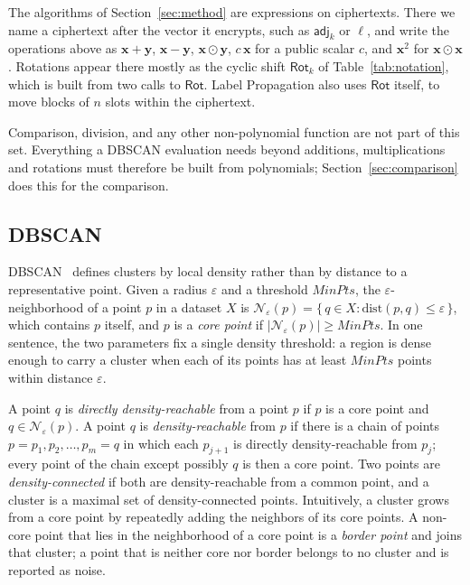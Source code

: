The algorithms of Section~\ref{sec:method} are expressions on
ciphertexts. There we name a ciphertext after the vector it encrypts,
such as $\mathsf{adj}_k$ or $\boldsymbol{\ell}$, and write the
operations above as $\mathbf{x} + \mathbf{y}$, $\mathbf{x} - \mathbf{y}$,
$\mathbf{x} \odot \mathbf{y}$, $c\,\mathbf{x}$ for a public scalar $c$,
and $\mathbf{x}^{2}$ for $\mathbf{x} \odot \mathbf{x}$. Rotations appear
there mostly as the cyclic shift $\mathsf{Rot}_k$ of
Table~\ref{tab:notation}, which is built from two calls to
$\mathsf{Rot}$. Label Propagation also uses $\mathsf{Rot}$ itself, to
move blocks of $n$ slots within the ciphertext.

Comparison, division, and any other non-polynomial function are not part
of this set. Everything a DBSCAN evaluation needs beyond additions,
multiplications and rotations must therefore be built from polynomials;
Section~\ref{sec:comparison} does this for the comparison.

\subsection{DBSCAN}
\label{sec:dbscan}

DBSCAN~\cite{ester1996density} defines clusters by local density rather
than by distance to a representative point. Given a radius $\varepsilon$
and a threshold $\mathit{MinPts}$, the $\varepsilon$-neighborhood of a
point $p$ in a dataset $X$ is
$\mathcal{N}_{\varepsilon}(p) = \{\, q \in X : \mathrm{dist}(p,q) \le \varepsilon
\,\}$, which contains $p$ itself, and $p$ is a \emph{core point} if
$|\mathcal{N}_{\varepsilon}(p)| \ge \mathit{MinPts}$. In one sentence, the two
parameters fix a single density threshold: a region is dense enough to
carry a cluster when each of its points has at least $\mathit{MinPts}$
points within distance $\varepsilon$.

A point $q$ is \emph{directly density-reachable} from a point $p$ if $p$
is a core point and $q \in \mathcal{N}_{\varepsilon}(p)$. A point $q$ is
\emph{density-reachable} from $p$ if there is a chain of points
$p = p_1, p_2, \dots, p_m = q$ in which each $p_{j+1}$ is directly
density-reachable from $p_j$; every point of the chain except possibly
$q$ is then a core point. Two points are \emph{density-connected} if both
are density-reachable from a common point, and a cluster is a maximal set
of density-connected points. Intuitively, a cluster grows from a core
point by repeatedly adding the neighbors of its core points. A non-core
point that lies in the neighborhood of a core point is a \emph{border
point} and joins that cluster; a point that is neither core nor border
belongs to no cluster and is reported as noise.

